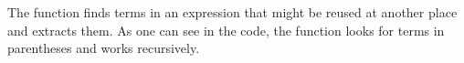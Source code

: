 The function  finds terms in an expression that might
be reused at another place and extracts them. As one can see in the code, the
function looks for terms in parentheses and works recursively. 















